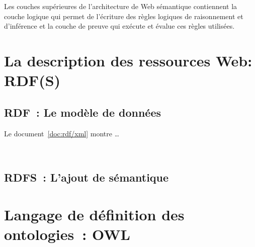 Les couches supérieures de l'architecture de Web sémantique
contiennent la couche logique qui permet de l'écriture des règles
logiques de raisonnement et d'inférence et la couche de preuve qui
exécute et évalue ces règles utilisées.

\section{La description des ressources Web: RDF(S)}
\label{sec:semantic-web-rdf}
\newpage

\subsection{RDF~: Le modèle de données}
\label{sec:semantic-web-rdf-rdf}

Le document~\ref{doc:rdf/xml} montre \dots 

\renewcommand{\lstlistingname}{Document}
~\label{doc:rdf/xml}

\subsection{RDFS~: L'ajout de sémantique}
\label{sec:semantic-web-rdfs}

\section{Langage de définition des ontologies~: OWL}
\label{sec:semantic-web-owl}





